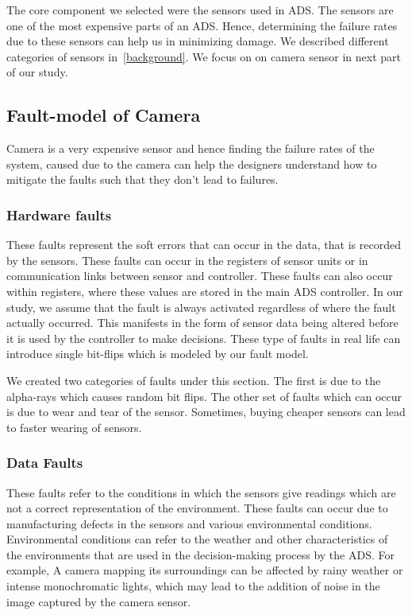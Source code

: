  The core component we selected were the  sensors used in ADS. The sensors are one of the most expensive parts of an ADS. Hence, determining the failure rates due to these sensors can help us in minimizing damage. We described different categories of sensors in~\ref{background}. We focus on on camera sensor in next part of our study.
 
 \subsection{Fault-model of Camera}
Camera is a very expensive sensor and hence finding the failure rates of the system, caused due to the camera can help the designers understand how to mitigate the faults such that they don't lead to failures.
 
 \subsubsection{Hardware faults} 
These faults represent the soft errors that can occur in the data, that is recorded by the sensors. These faults can occur in the registers of sensor units or in communication links between sensor and controller. These faults can also occur within registers, where these values are stored in the main ADS controller. In our study, we assume that the fault is always activated regardless of where the fault actually occurred. This manifests in the form of sensor data being altered before it is used by the controller to make decisions. These type of faults in real life can introduce single bit-flips which is modeled by our fault model. 

We created two categories of faults under this section. The first is due to the alpha-rays which causes random bit flips. The other set of faults which can occur is due to wear and tear of the sensor. Sometimes, buying cheaper sensors can lead to faster wearing of sensors.

 \medskip
\subsubsection{Data Faults} 
These faults refer to the conditions in which the sensors give readings which are not a correct representation of the environment. These faults can occur due to manufacturing defects in the sensors and various environmental conditions. Environmental conditions can refer to the weather and other characteristics of the environments that are used in the decision-making process by the ADS. For example, A camera mapping its surroundings can be affected by rainy weather or intense monochromatic lights, which may lead to the addition of noise in the image captured by the camera sensor.
 
